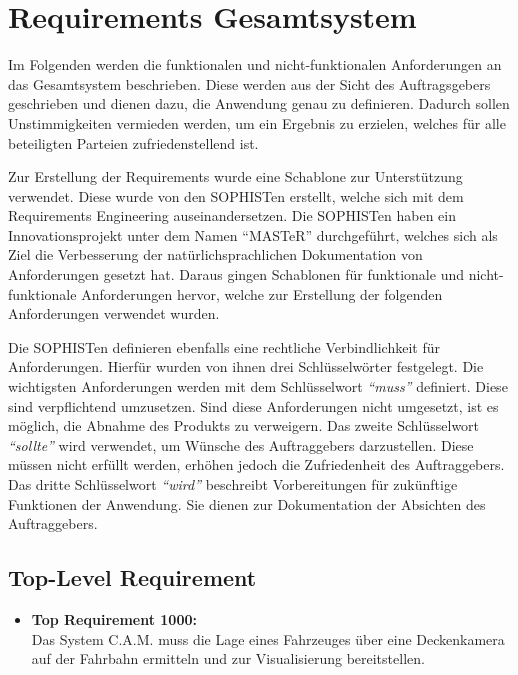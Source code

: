 \chapter{Requirements Gesamtsystem}
\label{sec:req}
Im Folgenden werden die funktionalen und nicht-funktionalen Anforderungen an das Gesamtsystem beschrieben. Diese werden aus der Sicht des Auftragsgebers geschrieben und dienen dazu, die Anwendung genau zu definieren. Dadurch sollen Unstimmigkeiten vermieden werden, um ein Ergebnis zu erzielen, welches f\"ur alle beteiligten Parteien zufriedenstellend ist.\par\medskip 
Zur Erstellung der Requirements wurde eine Schablone zur Unterst\"utzung verwendet.
Diese wurde von den SOPHISTen erstellt, welche sich mit dem Requirements Engineering auseinandersetzen. Die SOPHISTen haben ein Innovationsprojekt unter dem Namen \enquote{\ac{MASTeR}} durchgef\"uhrt, welches sich als Ziel die Verbesserung der nat\"urlichsprachlichen Dokumentation von Anforderungen gesetzt hat. Daraus gingen Schablonen f\"ur funktionale und
nicht-funktionale Anforderungen hervor, welche zur Erstellung der folgenden Anforderungen verwendet wurden\cite{SOPHISTGmbH2013}. \par\medskip 
Die SOPHISTen definieren ebenfalls eine rechtliche Verbindlichkeit f\"ur Anforderungen.
Hierf\"ur wurden von ihnen drei Schl\"usselw\"orter festgelegt. Die wichtigsten Anforderungen werden mit dem Schl\"usselwort \textit{\enquote{muss}} definiert. Diese sind verpflichtend umzusetzen.
Sind diese Anforderungen nicht umgesetzt, ist es m\"oglich, die Abnahme des Produkts zu verweigern. Das zweite Schl\"usselwort \textit{\enquote{sollte} }wird verwendet, um W\"unsche des Auftraggebers darzustellen. Diese m\"ussen nicht erf\"ullt werden, erh\"ohen jedoch die Zufriedenheit des Auftraggebers. Das dritte Schl\"usselwort \textit{\enquote{wird}} beschreibt Vorbereitungen f\"ur zuk\"unftige Funktionen der Anwendung. Sie dienen zur Dokumentation der Absichten des Auftraggebers.

\newpage
\section{Top-Level Requirement}
\begin{itemize}
\item \textbf{Top Requirement 1000:}\\
Das System C.A.M. muss die Lage eines Fahrzeuges \"uber eine Deckenkamera auf der Fahrbahn ermitteln und zur Visualisierung bereitstellen.
\end{itemize}

